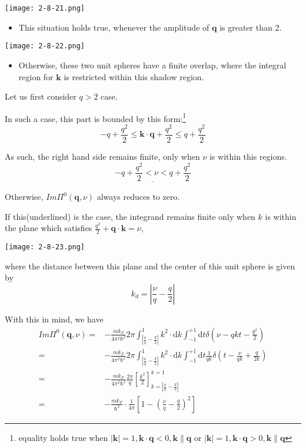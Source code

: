 \begin{center} \label{Fig2.8.21}
\texttt{[image: 2-8-21.png]}
\end{center}
\begin{itemize}
\item This situation holds true, whenever the amplitude of $\mathbf{q}$ is greater than 2.
\end{itemize}

\begin{center} \label{Fig2.8.22}
\texttt{[image: 2-8-22.png]}
\end{center}
\begin{itemize}
\item Otherwise, these two unit spheres have a finite overlap, where the integral region for $\mathbf{k}$ is restricted within this shadow region.
\end{itemize}

Let us first consider $q>2$ case.

In such a case, this part is bounded by this form:\footnote{equality holds true when $|\mathbf{k}|=1,\mathbf{k}\cdot \mathbf{q} < 0, \mathbf{k} \parallel \mathbf{q}$ or $|\mathbf{k}|=1,\mathbf{k}\cdot \mathbf{q} > 0, \mathbf{k} \parallel \mathbf{q}$}
\[ -q + \frac{q^2}{2} \leq \mathbf{k}\cdot\mathbf{q}+\frac{q^2}{2} \leq q+ \frac{q^2}{2} \]

As such, the right hand side remains finite, only when $\nu$ is within this regions.
\[ \underline{-q + \frac{q^2}{2} < \nu < q + \frac{q^2}{2}} \]

Otherwise, $Im\Pi^0(\mathbf{q},\nu)$ always reduces to zero.

If this(underlined) is the case, the integrand remains finite only when $k$ is within the plane which satisfies $\frac{q^2}{2}+\mathbf{q}\cdot \mathbf{k} = \nu$,
\begin{center} \label{Fig2.8.23}
\texttt{[image: 2-8-23.png]}
\end{center}

where the distance between this plane and the center of this unit sphere is given by
\[ k_d = |\frac{\nu}{q} - \frac{q}{2}| \]

With this in mind, we have
\begin{equation} \label{Eqs2.8.21} \begin{split}
Im\Pi^0(\mathbf{q},\nu) =& -\frac{m k_F}{4\pi^2 \hbar^2} 2\pi \int_{|\frac{\nu}{q}-\frac{q}{2}|}^1 k^2 \cdot \mathrm{d}k \int_{-1}^{+1} \mathrm{d}t \delta(\nu-qkt -\frac{q^2}{2})\\
=& -\frac{m k_F}{4\pi^2 \hbar^2} 2\pi \int_{|\frac{\nu}{q}-\frac{q}{2}|}^1 k^2 \cdot \mathrm{d}k \int_{-1}^{+1} \mathrm{d}t \frac{1}{qk}\delta(t - \frac{\nu}{qk} + \frac{q}{2k})\\
=&-\frac{m k_F}{4\pi^2 \hbar^2} \frac{2\pi}{q} \left[ \frac{k^2}{2} \right]_{k=|\frac{\nu}{q}-\frac{q}{2}|}^{k=1}\\
=&-\frac{m k_F}{\hbar^2} \cdot \frac{1}{4\pi} \left[ 1-\left( \frac{\nu}{q}-\frac{q}{2} \right)^2 \right]
\end{split}\end{equation}

